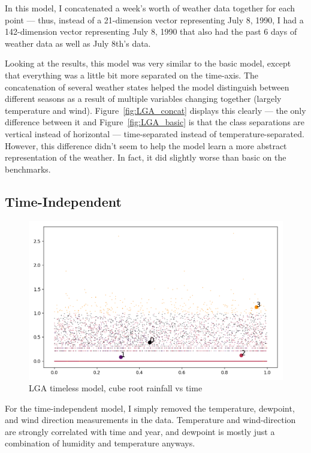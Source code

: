 \documentclass[a4paper]{article}
\begin{document}
In this model, I concatenated a week's worth of weather data together for each point --- thus, instead of a 21-dimension vector representing July 8, 1990, I had a 142-dimension vector representing July 8, 1990 that also had the past 6 days of weather data as well as July 8th's data. 

Looking at the results, this model was very similar to the basic model, except that everything was a little bit more separated on the time-axis. The concatenation of several weather states helped the model distinguish between different seasons as a result of multiple variables changing together (largely temperature and wind). Figure~\ref{fig:LGA_concat} displays this clearly --- the only difference between it and Figure~\ref{fig:LGA_basic} is that the class separations are vertical instead of horizontal --- time-separated instead of temperature-separated. However, this difference didn't seem to help the model learn a more abstract representation of the weather. In fact, it did slightly worse than basic on the benchmarks.

\subsection{Time-Independent}
\begin{figure}[t]
  \centering
  \includegraphics[width=\linewidth]{../png/models/LGA-timeless-cuberootrain4.png}
  \caption{LGA timeless model, cube root rainfall vs time}
  \label{fig:LGA_timeless_rain}
\end{figure}

For the time-independent model, I simply removed the temperature, dewpoint, and wind direction measurements in the data. Temperature and wind-direction are strongly correlated with time and year, and dewpoint is mostly just a combination of humidity and temperature anyways. 
\end{document}
